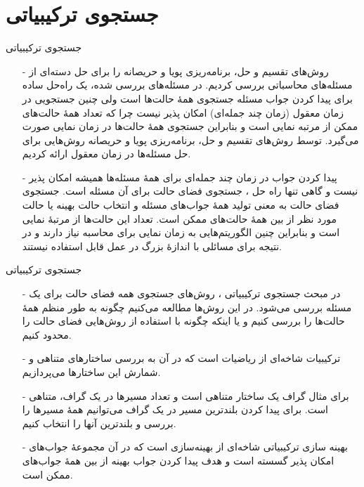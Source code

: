 \section{جستجوی ترکیبیاتی}

\begin{frame}{‌جستجوی ترکیبیاتی}
\begin{itemize}\itemr
\item[-]
روش‌های تقسیم و حل، برنامه‌ریزی پویا و حریصانه را برای حل دسته‌ای از مسئله‌های محاسباتی بررسی کردیم. در مسئله‌های بررسی شده، یک راه‌حل ساده برای پیدا کردن جواب مسئله جستجوی همهٔ حالت‌ها است ولی چنین جستجویی در زمان معقول (زمان چند جمله‌ای) امکان پذیر نیست چرا که تعداد همهٔ حالت‌های ممکن از مرتبه نمایی است و بنابراین جستجوی همهٔ حالت‌ها در زمان نمایی صورت می‌گیرد. توسط روش‌های تقسیم و حل، برنامه‌ریزی پویا و حریصانه روش‌هایی برای حل مسئله‌ها در زمان معقول ارائه کردیم.
\item[-]
پیدا کردن جواب در زمان چند جمله‌ای برای همهٔ مسئله‌ها همیشه امکان پذیر نیست و گاهی تنها راه حل ، جستجوی فضای حالت برای آن مسئله است. جستجوی فضای حالت به معنی تولید همهٔ جواب‌های مسئله و انتخاب حالت بهینه یا حالت مورد نظر از بین همهٔ حالت‌های ممکن است. تعداد این حالت‌ها از مرتبهٔ نمایی است و بنابراین چنین الگوریتم‌هایی به زمان نمایی برای محاسبه نیاز دارند و در نتیجه برای مسائلی با اندازهٔ بزرگ در عمل قابل استفاده نیستند.
\end{itemize}
\end{frame}


\begin{frame}{‌جستجوی ترکیبیاتی}
\begin{itemize}\itemr
\item[-]
در مبحث جستجوی ترکیبیاتی
، روش‌های جستجوی همه فضای حالت برای یک مسئله بررسی می‌شود. در این روش‌ها مطالعه می‌کنیم چگونه به طور منظم همهٔ حالت‌ها را بررسی کنیم و یا اینکه چگونه با استفاده از روش‌هایی فضای حالت را محدود کنیم.
\item[-]
ترکیبیات
شاخه‌ای از ریاضیات است که در آن به بررسی ساختارهای متناهی و شمارش این ساختارها می‌پردازیم.
\item[-]
برای مثال گراف یک ساختار متناهی است و تعداد مسیرها در یک گراف، متناهی است. برای پیدا کردن بلندترین مسیر در یک گراف می‌توانیم همهٔ مسیرها را بررسی و بلندترین آنها را انتخاب کنیم.
\item[-]
بهینه سازی ترکیبیاتی
شاخه‌ای از بهینه‌سازی است که در آن مجموعهٔ جواب‌های امکان پذیر گسسته است و هدف پیدا کردن جواب بهینه از بین همهٔ جواب‌های ممکن است.
\end{itemize}
\end{frame}